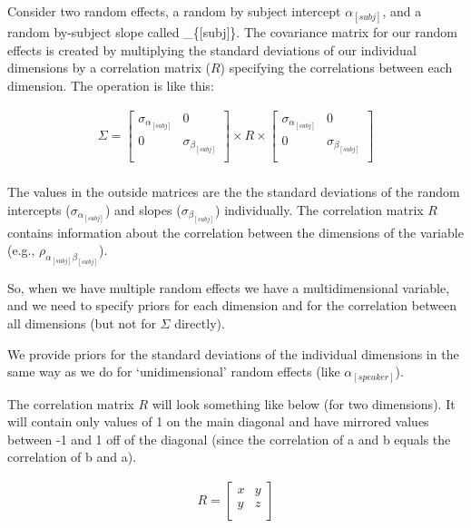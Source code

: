 \documentclass[
]{book}
\begin{document}
Consider two random effects, a random by subject intercept \(\alpha_{[subj]}\), and a random by-subject slope called \alpha\_\{{[}subj{]}\}. The covariance matrix for our random effects is created by multiplying the standard deviations of our individual dimensions by a correlation matrix (\(R\)) specifying the correlations between each dimension. The operation is like this:

\begin{equation}
\begin{split}
\Sigma = \begin{bmatrix} \sigma_{\alpha_{[subj]}} & 0 \\ 0 & \sigma_{\beta_{[subj]}} \\ \end{bmatrix} 
\times R \times
\begin{bmatrix} \sigma_{\alpha_{[subj]}} & 0 \\ 0 & \sigma_{\beta_{[subj]}} \\ \end{bmatrix} \\
\end{split}
\label{eq:66}
\end{equation}

The values in the outside matrices are the the standard deviations of the random intercepts (\(\sigma_{\alpha_{[subj]}}\)) and slopes (\(\sigma_{\beta_{[subj]}}\)) individually. The correlation matrix \(R\) contains information about the correlation between the dimensions of the variable (e.g., \(\rho_{\alpha_{[subj]} \beta _{[subj]}}\)).

So, when we have multiple random effects we have a multidimensional variable, and we need to specify priors for each dimension and for the correlation between all dimensions (but not for \(\Sigma\) directly).

We provide priors for the standard deviations of the individual dimensions in the same way as we do for `unidimensional' random effects (like \(\alpha_{[speaker]}\)).

The correlation matrix \(R\) will look something like below (for two dimensions). It will contain only values of 1 on the main diagonal and have mirrored values between -1 and 1 off of the diagonal (since the correlation of a and b equals the correlation of b and a).

\begin{equation}
\begin{split}
R = \begin{bmatrix} x & y \\ y & z \\ \end{bmatrix} \\ \\
\end{split}
\label{eq:67}
\end{equation}
\end{document}
